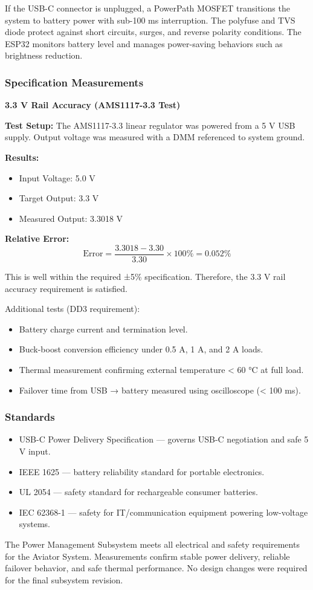 If the USB-C connector is unplugged, a PowerPath MOSFET transitions the system to battery power with sub-100 ms interruption. The polyfuse and TVS diode protect against short circuits, surges, and reverse polarity conditions. The ESP32 monitors battery level and manages power-saving behaviors such as brightness reduction.

\subsubsection{Specification Measurements}
\textbf{3.3 V Rail Accuracy (AMS1117-3.3 Test)}

\textbf{Test Setup:}
The AMS1117-3.3 linear regulator was powered from a 5 V USB supply. Output voltage was measured with a DMM referenced to system ground.

\textbf{Results:}
\begin{itemize}
    \item Input Voltage: 5.0 V
    \item Target Output: 3.3 V
    \item Measured Output: 3.3018 V
\end{itemize}

\textbf{Relative Error:}
\[
    \text{Error} =
    \frac{3.3018 - 3.30}{3.30} \times 100\% = 0.052\%
\]

This is well within the required ±5\% specification.
Therefore, the 3.3 V rail accuracy requirement is satisfied.

Additional tests (DD3 requirement):
\begin{itemize}
    \item Battery charge current and termination level.
    \item Buck-boost conversion efficiency under 0.5 A, 1 A, and 2 A loads.
    \item Thermal measurement confirming external temperature < 60 °C at full load.
    \item Failover time from USB → battery measured using oscilloscope (< 100 ms).
\end{itemize}

\subsubsection{Standards}

\begin{itemize}
    \item USB-C Power Delivery Specification — governs USB-C negotiation and safe 5 V input.
    \item IEEE 1625 — battery reliability standard for portable electronics.
    \item UL 2054 — safety standard for rechargeable consumer batteries.
    \item IEC 62368-1 — safety for IT/communication equipment powering low-voltage systems.
\end{itemize}

The Power Management Subsystem meets all electrical and safety requirements for the Aviator System.
Measurements confirm stable power delivery, reliable failover behavior, and safe thermal performance.
No design changes were required for the final subsystem revision.
